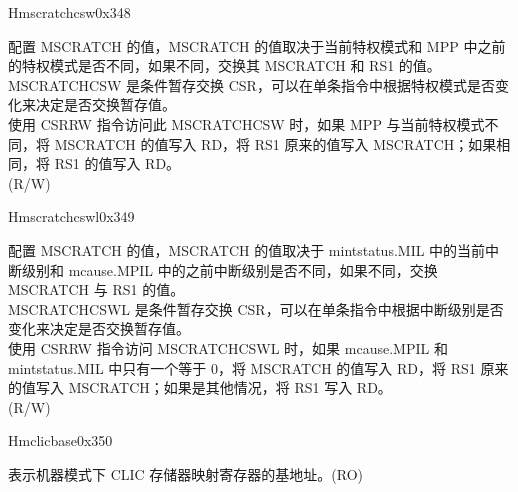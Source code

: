 \begin{register}{H}{mscratchcsw}{0x348}\label{regdesc:MSCRATCHCSW_REG}
%
\regnewline%
\begin{regdesc}\begin{reglist}
\label{fielddesc:MSCRATCHCSW}\item [MSCRATCHCSW] 配置 MSCRATCH 的值，MSCRATCH 的值取决于当前特权模式和 MPP 中之前的特权模式是否不同，如果不同，交换其 MSCRATCH 和 RS1 的值。\\
MSCRATCHCSW 是条件暂存交换 CSR，可以在单条指令中根据特权模式是否变化来决定是否交换暂存值。\\
使用 CSRRW 指令访问此 MSCRATCHCSW 时，如果 MPP 与当前特权模式不同，将 MSCRATCH 的值写入 RD，将 RS1 原来的值写入 MSCRATCH；如果相同，将 RS1 的值写入 RD。\\
(R/W)
\end{reglist}\end{regdesc}
\end{register}

\begin{register}{H}{mscratchcswl}{0x349}\label{regdesc:MSCRATCHCSWL_REG}
%
\regnewline%
\begin{regdesc}\begin{reglist}
\label{fielddesc:MSCRATCHCSWL}\item [MSCRATCHCSWL] 配置 MSCRATCH 的值，MSCRATCH 的值取决于 mintstatus.MIL 中的当前中断级别和 mcause.MPIL 中的之前中断级别是否不同，如果不同，交换 MSCRATCH 与 RS1 的值。\\
MSCRATCHCSWL 是条件暂存交换 CSR，可以在单条指令中根据中断级别是否变化来决定是否交换暂存值。\\
使用 CSRRW 指令访问 MSCRATCHCSWL 时，如果 mcause.MPIL 和 mintstatus.MIL 中只有一个等于 0，将 MSCRATCH 的值写入 RD，将 RS1 原来的值写入 MSCRATCH；如果是其他情况，将 RS1 写入 RD。\\
(R/W)


\end{reglist}\end{regdesc}
\end{register}

\begin{register}{H}{mclicbase}{0x350}\label{regdesc:MCLICBASE_REG}
%
\regnewline%
\begin{regdesc}\begin{reglist}
\label{fielddesc:MCLICBASE}\item [MCLICBASE] 表示机器模式下 CLIC 存储器映射寄存器的基地址。(RO)
\end{reglist}\end{regdesc}
\end{register}








